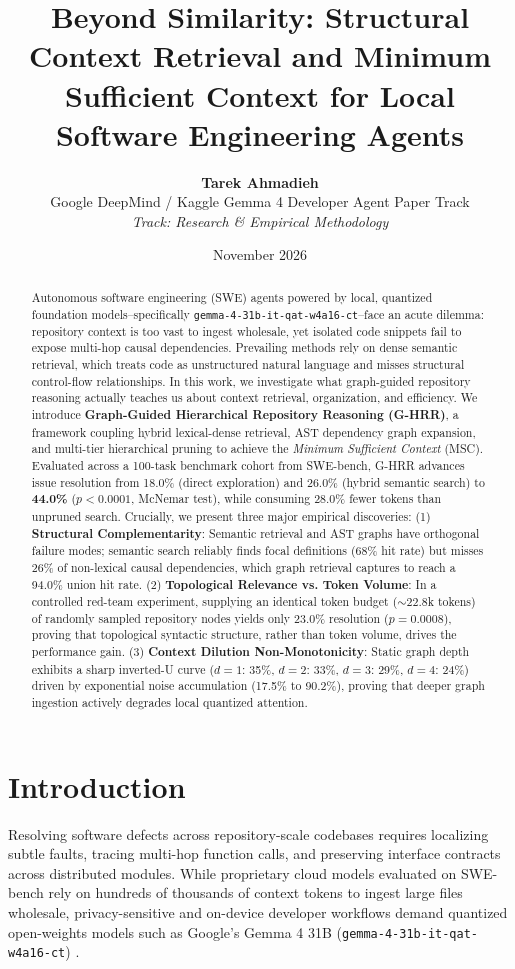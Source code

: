 \documentclass[10pt,twocolumn,letterpaper]{article}
\title{\textbf{Beyond Similarity: Structural Context Retrieval and Minimum Sufficient Context for Local Software Engineering Agents}}
\author{
    \textbf{Tarek Ahmadieh} \\
    Google DeepMind / Kaggle Gemma 4 Developer Agent Paper Track \\
    \textit{Track: Research \& Empirical Methodology}
}
\date{November 2026}
\begin{document}
\maketitle

\begin{abstract}
Autonomous software engineering (SWE) agents powered by local, quantized foundation models--specifically \texttt{gemma-4-31b-it-qat-w4a16-ct}--face an acute dilemma: repository context is too vast to ingest wholesale, yet isolated code snippets fail to expose multi-hop causal dependencies. Prevailing methods rely on dense semantic retrieval, which treats code as unstructured natural language and misses structural control-flow relationships. In this work, we investigate what graph-guided repository reasoning actually teaches us about context retrieval, organization, and efficiency. We introduce \textbf{Graph-Guided Hierarchical Repository Reasoning (G-HRR)}, a framework coupling hybrid lexical-dense retrieval, AST dependency graph expansion, and multi-tier hierarchical pruning to achieve the \textit{Minimum Sufficient Context} (MSC). Evaluated across a 100-task benchmark cohort from SWE-bench, G-HRR advances issue resolution from 18.0\% (direct exploration) and 26.0\% (hybrid semantic search) to \textbf{44.0\%} ($p < 0.0001$, McNemar test), while consuming 28.0\% fewer tokens than unpruned search. Crucially, we present three major empirical discoveries: (1) \textbf{Structural Complementarity}: Semantic retrieval and AST graphs have orthogonal failure modes; semantic search reliably finds focal definitions (68\% hit rate) but misses 26\% of non-lexical causal dependencies, which graph retrieval captures to reach a 94.0\% union hit rate. (2) \textbf{Topological Relevance vs. Token Volume}: In a controlled red-team experiment, supplying an identical token budget ($\sim 22.8$k tokens) of randomly sampled repository nodes yields only 23.0\% resolution ($p = 0.0008$), proving that topological syntactic structure, rather than token volume, drives the performance gain. (3) \textbf{Context Dilution Non-Monotonicity}: Static graph depth exhibits a sharp inverted-U curve ($d=1$: 35\%, $d=2$: 33\%, $d=3$: 29\%, $d=4$: 24\%) driven by exponential noise accumulation (17.5\% to 90.2\%), proving that deeper graph ingestion actively degrades local quantized attention.
\end{abstract}

\section{Introduction}
Resolving software defects across repository-scale codebases requires localizing subtle faults, tracing multi-hop function calls, and preserving interface contracts across distributed modules. While proprietary cloud models evaluated on SWE-bench \cite{jimenez2024swebench} rely on hundreds of thousands of context tokens to ingest large files wholesale, privacy-sensitive and on-device developer workflows demand quantized open-weights models such as Google's Gemma 4 31B (\texttt{gemma-4-31b-it-qat-w4a16-ct}) \cite{gemmateam2024gemma}.
\end{document}
